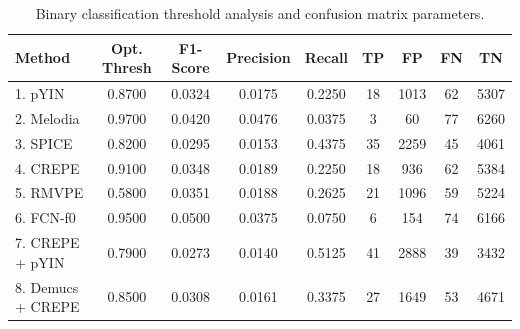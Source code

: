 \begin{table}[h!]
\centering
\caption{Binary classification threshold analysis and confusion matrix parameters.}
\label{tab:ciarp_table3}
\begin{tabular}{|l|c|c|c|c|c|c|c|c|}
\hline
\textbf{Method} & \textbf{Opt. Thresh} & \textbf{F1-Score} & \textbf{Precision} & \textbf{Recall} & \textbf{TP} & \textbf{FP} & \textbf{FN} & \textbf{TN} \\
\hline
1. pYIN & 0.8700 & 0.0324 & 0.0175 & 0.2250 & 18 & 1013 & 62 & 5307 \\
2. Melodia & 0.9700 & 0.0420 & 0.0476 & 0.0375 & 3 & 60 & 77 & 6260 \\
3. SPICE & 0.8200 & 0.0295 & 0.0153 & 0.4375 & 35 & 2259 & 45 & 4061 \\
4. CREPE & 0.9100 & 0.0348 & 0.0189 & 0.2250 & 18 & 936 & 62 & 5384 \\
5. RMVPE & 0.5800 & 0.0351 & 0.0188 & 0.2625 & 21 & 1096 & 59 & 5224 \\
6. FCN-f0 & 0.9500 & 0.0500 & 0.0375 & 0.0750 & 6 & 154 & 74 & 6166 \\
7. CREPE + pYIN & 0.7900 & 0.0273 & 0.0140 & 0.5125 & 41 & 2888 & 39 & 3432 \\
8. Demucs + CREPE & 0.8500 & 0.0308 & 0.0161 & 0.3375 & 27 & 1649 & 53 & 4671 \\
\hline
\end{tabular}
\end{table}
